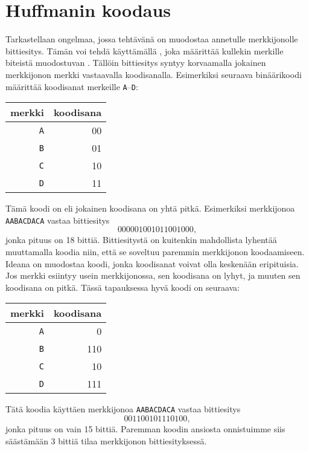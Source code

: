 \section{Huffmanin koodaus}


Tarkastellaan ongelmaa, jossa
tehtävänä on muodostaa annetulle merkkijonolle bittiesitys.
Tämän voi tehdä käyttämällä ,
joka määrittää kullekin merkille
biteistä muodostuvan .
Tällöin bittiesitys syntyy korvaamalla jokainen
merkkijonon merkki vastaavalla koodisanalla.
Esimerkiksi seuraava binäärikoodi määrittää
koodisanat merkeille \texttt{A}–\texttt{D}:
\begin{center}
\begin{tabular}{rr}
merkki & koodisana \\
\hline
\texttt{A} & 00 \\
\texttt{B} & 01 \\
\texttt{C} & 10 \\
\texttt{D} & 11 \\
\end{tabular}
\end{center}
Tämä koodi on 
eli jokainen koodisana on yhtä pitkä.
Esimerkiksi merkkijonoa
\texttt{AABACDACA} vastaa bittiesitys
\[000001001011001000,\]
jonka pituus on 18 bittiä.
Bittiesitystä on kuitenkin mahdollista lyhentää
muuttamalla koodia niin, että se soveltuu
paremmin merkkijonon koodaamiseen.
Ideana on muodostaa koodi, jonka koodisanat
voivat olla keskenään eripituisia.
Jos merkki esiintyy usein merkkijonossa,
sen koodisana on lyhyt, ja muuten sen
koodisana on pitkä.
Tässä tapauksessa hyvä koodi on seuraava:
\begin{center}
\begin{tabular}{rr}
merkki & koodisana \\
\hline
\texttt{A} & 0 \\
\texttt{B} & 110 \\
\texttt{C} & 10 \\
\texttt{D} & 111 \\
\end{tabular}
\end{center}
Tätä koodia käyttäen merkkijonoa \texttt{AABACDACA}
vastaa bittiesitys
\[001100101110100,\]
jonka pituus on vain 15 bittiä.
Paremman koodin ansiosta onnistuimme siis säästämään
3 bittiä tilaa merkkijonon bittiesityksessä.

